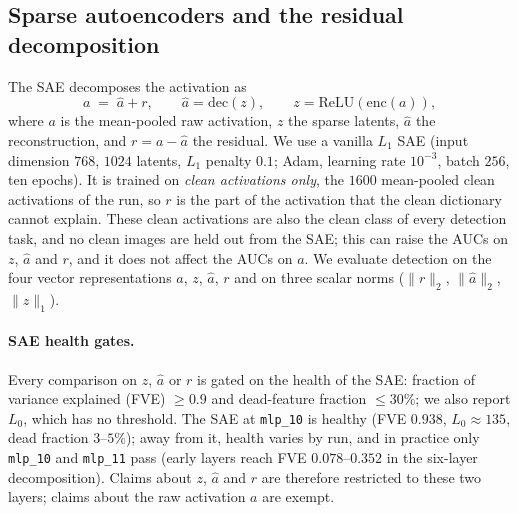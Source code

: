 \documentclass[../ppgc-tese.tex]{subfiles}
\begin{document}
\subsection{Sparse autoencoders and the residual decomposition}
\label{sec:adv-sae}
The SAE decomposes the activation as
\begin{equation}
  a \;=\; \hat{a} + r,
  \qquad \hat{a} = \mathrm{dec}(z), \qquad z = \mathrm{ReLU}(\mathrm{enc}(a)),
  \label{eq:adv-decomp}
\end{equation}
where $a$ is the mean-pooled raw activation, $z$ the sparse latents, $\hat{a}$
the reconstruction, and $r=a-\hat{a}$ the residual. We use a vanilla $L_1$ SAE
(input dimension $768$, $1024$ latents, $L_1$ penalty $0.1$; Adam, learning
rate $10^{-3}$, batch $256$, ten epochs). %
It is trained on \emph{clean activations only}, the $1600$ mean-pooled clean
activations of the run, so $r$ is the part of the activation that the clean
dictionary cannot explain. These clean activations are also the clean class of
every detection task, and no clean images are held out from the SAE; this can
raise the AUCs on $z$, $\hat{a}$ and $r$, and it does not affect the AUCs on
$a$. We evaluate detection on the four vector representations $a$, $z$,
$\hat{a}$, $r$ and on three scalar norms ($\lVert r\rVert_2$,
$\lVert\hat{a}\rVert_2$, $\lVert z\rVert_1$).

\paragraph*{SAE health gates.}
Every comparison on $z$, $\hat{a}$ or $r$ is gated on the health of the SAE:
fraction of variance explained (FVE) $\geq 0.9$ and dead-feature fraction
$\leq 30\%$; we also report $L_0$, which has no threshold. %
The SAE at \texttt{mlp\_10} is healthy (FVE $0.938$, $L_0\approx135$, dead
fraction $3$--$5\%$); away from it, health varies by run, and in practice only
\texttt{mlp\_10} and \texttt{mlp\_11} pass (early layers reach FVE
$0.078$--$0.352$ in the six-layer decomposition).
Claims about $z$, $\hat{a}$ and $r$ are therefore restricted to these two
layers; claims about the raw activation $a$ are exempt.
\end{document}

